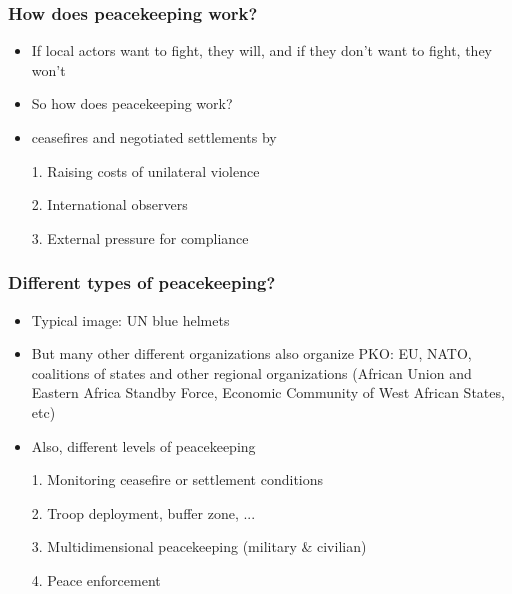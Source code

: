 \documentclass[aspectratio=43]{beamer}
\begin{document}
\begin{frame}
\frametitle{How does peacekeeping work?}
\centering

\begin{itemize}[<+->]
  \item If local actors want to fight, they will, and if they don't want to fight, they won't
  \item So how does peacekeeping work?
  \item {\color{red}{Sustaining}} ceasefires and negotiated settlements by
  \item[1.] Raising costs of unilateral violence
  \item[2.] International observers
  \item[3.] External pressure for compliance
\end{itemize}

\end{frame}

\begin{frame}
\frametitle{Different types of peacekeeping?}
\centering

\begin{itemize}[<+->]
  \item Typical image: UN blue helmets
  \item But many other different organizations also organize PKO: EU, NATO, coalitions of states and other regional organizations (African Union and Eastern Africa Standby Force, Economic Community of West African States, etc)
  \item Also, different levels of peacekeeping
  \item[1.] Monitoring ceasefire or settlement conditions
  \item[2.] Troop deployment, buffer zone, ...
  \item[3.] Multidimensional peacekeeping (military \& civilian)
  \item[4.] Peace enforcement
\end{itemize}

\end{frame}
\end{document}

